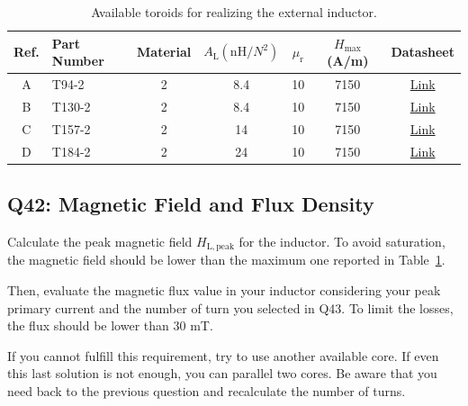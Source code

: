 \documentclass{PELsmallreport}
\begin{document}
 \qquad {} \qquad {} \hfill{}

\begin{table}[!h]
\centering
\caption{Available toroids for realizing the external inductor. }
\label{tab:toroids}
\begin{tabular}{clccccc}
	\toprule
	Ref. & Part Number  & Material & $A_\mathrm{L} \left(\mathrm{nH}/N^2\right)$   & $\mu_\mathrm{r}$ & $H_\mathrm{max}$ (A/m) & Datasheet           \\
	\toprule
    A & T94-2      & 2   & 8.4   & 10    & 7150  & \href{https://www.rf-microwave.com/resources/products_attachments/6128f4a31a84b.pdf}{Link}\\
    B & T130-2      & 2 & 8.4   & 10    & 7150  & \href{https://www.rf-microwave.com/resources/products_attachments/6128f4a31a84b.pdf}{Link}\\
    C & T157-2      & 2  & 14    & 10    & 7150  &  \href{https://datasheets.micrometals.com/T157-2-DataSheet.pdf}{Link}\\
    D & T184-2      & 2  & 24    & 10    & 7150  &  \href{https://datasheets.micrometals.com/T184-2-DataSheet.pdf}{Link}\\
	\bottomrule
\end{tabular}
\end{table}


\subsection{Q42: Magnetic Field and Flux Density}
Calculate the peak magnetic field $H_{\mathrm{L,peak}}$ for the inductor. 
To avoid saturation, the magnetic field should be lower than the maximum one reported in Table~\ref{tab:toroids}. 

Then, evaluate the magnetic flux value in your inductor considering your peak primary current and the number of turn you selected in Q43. 
To limit the losses, the flux should be lower than 30 mT. 

If you cannot fulfill this requirement, try to use another available core. 
If even this last solution is not enough, you can parallel two cores. 
Be aware that you need back to the previous question and recalculate the number of turns. 
\\
\end{document}
